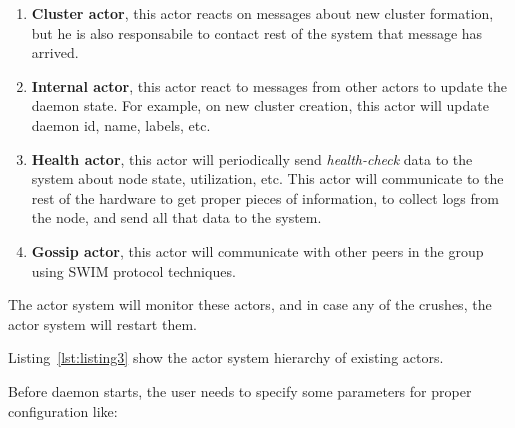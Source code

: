 \begin{enumerate}[start=1,label={(\bfseries \arabic*)}]
	\item \textbf{Cluster actor}, this actor reacts on messages about new cluster formation, but he is also responsabile to contact rest of the system that message has arrived.
	\item \textbf{Internal actor}, this actor react to messages from other actors to update the daemon state. For example, on new cluster creation, this actor will update daemon id, name, labels, etc.
	\item \textbf{Health actor}, this actor will periodically send \emph{health-check} data to the system about node state, utilization, etc. This actor will communicate to the rest of the hardware to get proper pieces of information, to collect logs from the node, and send all that data to the system.
	\item \textbf{Gossip actor}, this actor will communicate with other peers in the group using SWIM protocol techniques.
\end{enumerate}

\noindent
The actor system will monitor these actors, and in case any of the crushes, the actor system will restart them. 

Listing~\ref{lst:listing3} show the actor system hierarchy of existing actors.



\noindent
Before daemon starts, the user needs to specify some parameters for proper configuration like: 

